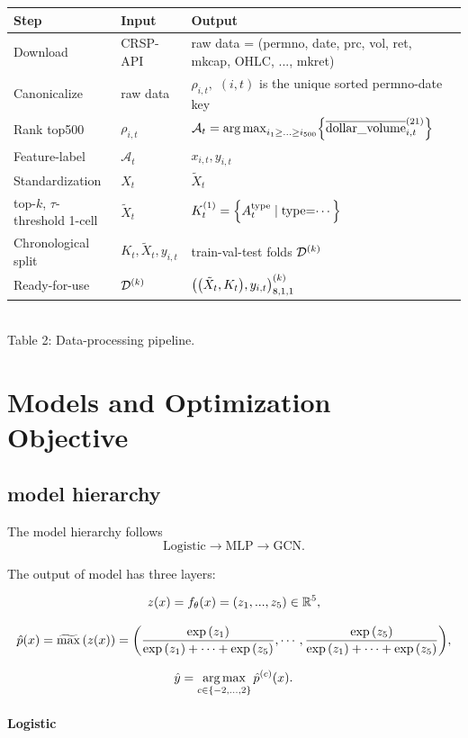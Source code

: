\documentclass[11pt]{article}
\begin{document}
\begin{center}
\begin{tabular}{lll}
\toprule
\textbf{Step} & \textbf{Input} & \textbf{Output} \\
\midrule
Download
    & CRSP-API 
    & raw data = (permno, date, prc, vol, ret, mkcap, OHLC, ..., mkret)\\
Canonicalize
    & raw data
    & $\rho_{i,t},$  $(i,t)$ is the unique sorted permno-date key\\
Rank top500 
    & $\rho_{i,t}$
    & $\mathcal A_t = \argmax_{i_1\ge...\ge i_{500}}\st{\overline{\tx{dollar\_volume}}_{i,t}^\pa{21}}$\\
Feature-label
    & $\mathcal A_t$
    & $x_{i,t}, y_{i,t}$ \\
Standardization
    & $X_t$
    & $\tilde X_t$\\
top-$k$, $\tau$-threshold 1-cell
    & $\tilde X_t$
    & $K^{\left\lparen1\right\rparen}_t =\left\lbrace A_t^{\text{type}}\mid\text{type=$\cdots$}\right\rbrace$\\
Chronological split
    & $K_t, \tilde X_t, y_{i,t}$
    & train-val-test folds $\mathcal{D}^{\left\lparen k\right\rparen}$\\
Ready-for-use
    & $\mathcal{D}^{\left\lparen k\right\rparen}$
    & ${\left\lparen{\left\lparen\tilde X_t,K_t\right\rparen}, y_{i,t}\right\rparen}^{\left\lparen k\right\rparen}_{8,1,1}$ \\
\bottomrule
\end{tabular}
\smallskip\\
Table 2: Data-processing pipeline.
\end{center}



\section{Models and Optimization Objective}

\subsection{model hierarchy}
The model hierarchy follows
\[
    \text{Logistic} \to \text{MLP} \to \text{GCN}.
\]

The output of model has three layers:

\[z(x)= f_\theta(x) = {\left\lparen z_1,...,z_5\right\rparen} \in \mathbb R^5,\]

\[\hat p(x) = \operatorname{\widetilde{\max}}{\left\lparen z(x)\right\rparen} = {\left\lparen\frac{\exp{\left\lparen z_1\right\rparen}}{\exp{\left\lparen z_1\right\rparen}+\cdots + \exp{\left\lparen z_5\right\rparen}},\cdots, \frac{\exp{\left\lparen z_5\right\rparen}}{\exp{\left\lparen z_1\right\rparen}+\cdots+\exp{\left\lparen z_5\right\rparen}}\right\rparen},\]

\[\hat y =\operatorname*{arg\,max}_{c\in \left\lbrace-2,...,2\right\rbrace} \hat p^{\left\lparen c\right\rparen}(x).\]
\paragraph{Logistic}
\end{document}

